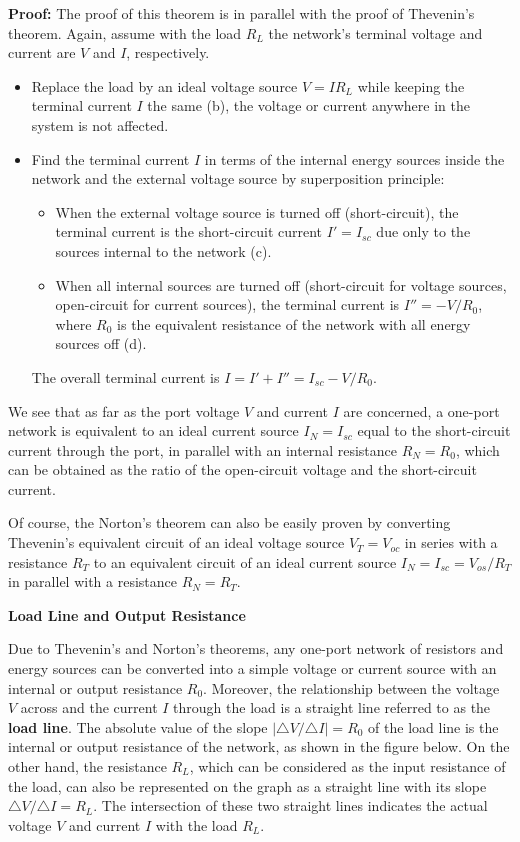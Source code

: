 \begin{itemize}
{\bf Proof:} The proof of this theorem is in parallel with the proof of 
Thevenin's theorem. Again, assume with the load $R_L$ the network's 
terminal voltage and current are $V$ and $I$, respectively. 


\begin{itemize}
\item Replace the load by an ideal voltage source $V=IR_L$ while keeping 
  the terminal current $I$ the same (b), the voltage or current anywhere 
  in the system is not affected. 
	
\item Find the terminal current $I$ in terms of the internal energy sources 
  inside the network and the external voltage source by superposition 
  principle:
  \begin{itemize}
  \item When the external voltage source is turned off (short-circuit), 
    the terminal current is the short-circuit current $I'=I_{sc}$ due only 
    to the sources internal to the network (c).
  \item When all internal sources are turned off (short-circuit for
    voltage sources, open-circuit for current sources), the terminal 
    current is $I''=-V/R_0$, where $R_0$ is the equivalent resistance of 
    the network with all energy sources off (d).
  \end{itemize}
  The overall terminal current is $I=I'+I''=I_{sc}-V/R_0$. 
\end{itemize}
We see that as far as the port voltage $V$ and current $I$ are concerned, 
a one-port network is equivalent to an ideal current source $I_N=I_{sc}$ equal 
to the short-circuit current through the port, in parallel with an internal 
resistance $R_N=R_0$, which can be obtained as the ratio of the open-circuit 
voltage and the short-circuit current.

Of course, the Norton's theorem can also be easily proven by converting 
Thevenin's equivalent circuit of an ideal voltage source $V_T=V_{oc}$ in 
series with a resistance $R_T$ to an equivalent circuit of an ideal current 
source $I_N=I_{sc}=V_{os}/R_T$ in parallel with a resistance $R_N=R_T$.

{\bf Load Line and Output Resistance}

Due to Thevenin's and Norton's theorems, any one-port network of 
resistors and energy sources can be converted into a simple voltage or 
current source with an internal or output resistance $R_0$. Moreover, 
the relationship between the voltage $V$ across and the current $I$ 
through the load is a straight line referred to as the {\bf load line}.
The absolute value of the slope $|\triangle V/\triangle I|=R_0$ of the
load line is the internal or output resistance of the network, as shown
in the figure below. On the other hand, the resistance $R_L$, which 
can be considered as the input resistance of the load, can also be 
represented on the graph as a straight line with its slope 
$\triangle V/\triangle I=R_L$. The intersection of these two straight
lines indicates the actual voltage $V$ and current $I$ with the load 
$R_L$.


\end{itemize}
